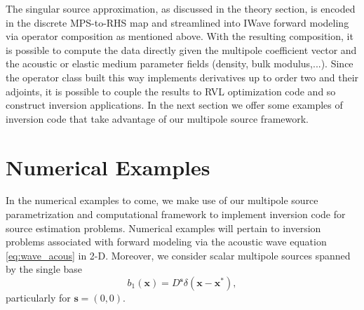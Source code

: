 The singular source approximation, as discussed in the theory section, is encoded in the discrete MPS-to-RHS map and streamlined into IWave forward modeling via operator composition as mentioned above.
With the resulting composition, it is possible to compute the data directly given the multipole coefficient vector and the acoustic or elastic medium parameter fields (density, bulk modulus,...). 
Since the operator class built this way implements derivatives up to order two and their adjoints, it is possible to couple the results to RVL optimization code and so construct inversion applications. 
In the next section we offer some examples of inversion code that take advantage of our multipole source framework.





\section{Numerical Examples}

In the numerical examples to come, we make use of our multipole source parametrization and computational framework to implement inversion code for source estimation problems.
Numerical examples will pertain to inversion problems associated with forward modeling via the acoustic wave equation \ref{eq:wave_acous} in 2-D.
Moreover, we consider scalar multipole sources spanned by the single base
\begin{equation}\label{eq:singleMPS}
	b_1(\mathbf x) = D^{\mathbf s}\delta(\mathbf x-\mathbf x^*),
\end{equation}
particularly for $\mathbf s=(0,0)$.

